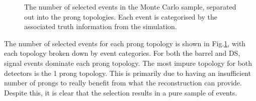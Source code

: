 \begin{figure}
  \centering
  \caption{The number of selected events in the Monte Carlo sample, separated out into the prong topologies.  Each event is categorised by the associated truth information from the simulation.}
  \label{fig:ProngStackSelected}
\end{figure}
The number of selected events for each prong topology is shown in Fig.\ref{fig:ProngStackSelected}, with each topology broken down by event categories.  For both the barrel and DS, signal events dominate each prong topology.  The most impure topology for both detectors is the 1 prong topology.  This is primarily due to having an insufficient number of prongs to really benefit from what the reconstruction can provide.  Despite this, it is clear that the selection results in a pure sample of events.  
